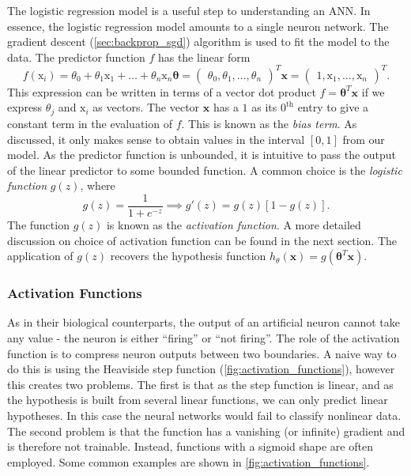 The logistic regression model is a useful step to understanding an ANN. In essence, the logistic regression model amounts to a single neuron network. The gradient descent (\cref{sec:backprop_sgd}) algorithm is used to fit the model to the data. The predictor function $f$ has the linear form 
%
\begin{equation}\label{linear predictor}
    f(\mathrm{x}_i) = \theta_0 + \theta_1 \mathrm{x}_1 + \ldots + \theta_n \mathrm{x}_n 
    \bm{\theta} = \begin{pmatrix} \theta_0 , \theta_1 , \ldots , \theta_n \end{pmatrix}^T
    \mathbf{x} = \begin{pmatrix} 1 , \mathrm{x}_1 , \ldots , \mathrm{x}_n \end{pmatrix}^T .
\end{equation}
%
This expression can be written in terms of a vector dot product $f = \bm{\theta}^T \mathbf{x}$ if we express $\theta_j$ and $\mathrm{x}_i$ as vectors. The vector $\mathbf{x}$ has a $1$ as its $0^{\mathrm{th}}$ entry to give a constant term in the evaluation of $f$. This is known as the \textit{bias term}. As discussed, it only makes sense to obtain values in the interval $[0,1]$ from our model. As the predictor function is unbounded, it is intuitive to pass the output of the linear predictor to some bounded function. A common choice is the \textit{logistic function} $g(z)$, where
%
\begin{equation}\label{logistic}
    g(z) = \frac{1}{1 + e^{-z}} \implies g'(z) = g(z) [1 - g(z)] .
\end{equation}
%
The function $g(z)$ is known as the \textit{activation function}. A more detailed discussion on choice of activation function can be found in the next section. The application of $g(z)$ recovers the hypothesis function $h_\theta(\mathbf{x}) = g(\bm{\theta}^T \mathbf{x})$.



\subsubsection{Activation Functions}

As in their biological counterparts, the output of an artificial neuron cannot take any value - the neuron is either ``firing'' or ``not firing''. The role of the activation function is to compress neuron outputs between two boundaries. A naive way to do this is using the Heaviside step function (\ref{fig:activation_functions}), however this creates two problems. The first is that as the step function is linear, and as the hypothesis is built from several linear functions, we can only predict linear hypotheses. In this case the neural networks would fail to classify nonlinear data. The second problem is that the function has a vanishing (or infinite) gradient and is therefore not trainable. Instead, functions with a sigmoid shape are often employed. Some common examples are shown in \ref{fig:activation_functions}.

